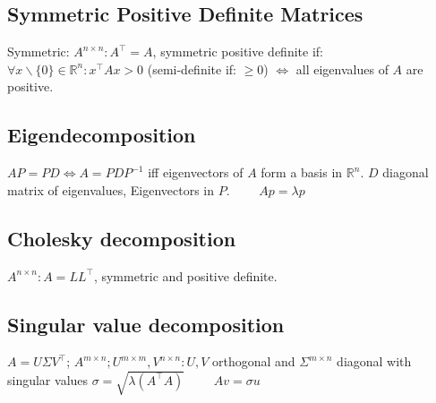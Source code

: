 \subsection*{Symmetric Positive Definite Matrices}
Symmetric: $A^{n\times n}: A^{\top} = A$, symmetric positive definite if:  $\forall x \backslash \{0\} \in \mathbb{R}^n: x^{\top}A x > 0$ (semi-definite if: $\geq 0$) $\Leftrightarrow$ all eigenvalues of $A$ are positive.

\subsection{Eigendecomposition}
$AP = PD \Leftrightarrow A = PDP^{-1}$ iff eigenvectors of $A$ form a basis in $\mathbb{R}^n$. $D$ diagonal matrix of eigenvalues, Eigenvectors in $P$. $\qquad Ap = \lambda p$

\subsection{Cholesky decomposition}
$A^{n\times n}: A = LL^{\top}$, symmetric and positive definite.

\subsection{Singular value decomposition}
$ A = U \Sigma V^{\top}$; $A^{m \times n}; U^{m \times m}, V^{n \times n}: U,V$ orthogonal and $\Sigma^{m \times n}$ diagonal with singular values $\sigma = \sqrt{\lambda (A^{\top}A)}$ $\qquad A v = \sigma u$
